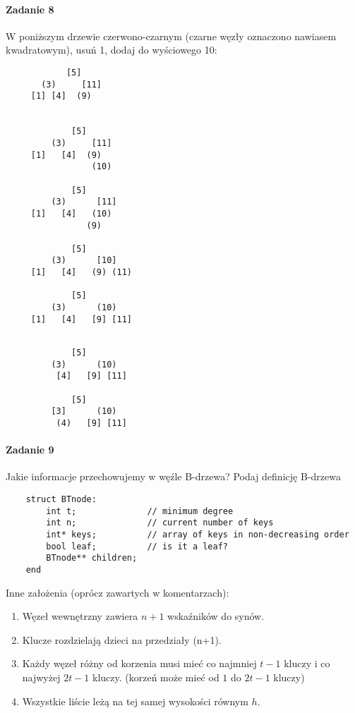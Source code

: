 \documentclass[18pt]{extarticle}
\begin{document}
\paragraph{Zadanie 8} W poniższym drzewie czerwono-czarnym (czarne węzły oznaczono nawiasem kwadratowym), usuń 1, dodaj do wyściowego 10:

\begin{multicols}{2}
    \begin{lstlisting}
            [5] 
       (3)     [11] 
     [1] [4]  (9) 
    
    
             [5] 
         (3)     [11] 
     [1]   [4]  (9) 
                 (10) 
     
             [5] 
         (3)      [11] 
     [1]   [4]   (10) 
                (9) 
     
             [5] 
         (3)      [10] 
     [1]   [4]   (9) (11)
     
             [5] 
         (3)      (10) 
     [1]   [4]   [9] [11]
                 
    \end{lstlisting}
    
    \columnbreak
    \begin{lstlisting}
             [5] 
         (3)      (10) 
          [4]   [9] [11]
    
             [5] 
         [3]      (10) 
          (4)   [9] [11]
    \end{lstlisting}
    \end{multicols}

\paragraph{Zadanie 9} Jakie informacje przechowujemy w węźle B-drzewa? Podaj definicję B-drzewa

\begin{lstlisting}
    struct BTnode:
        int t;              // minimum degree
        int n;              // current number of keys
        int* keys;          // array of keys in non-decreasing order
        bool leaf;          // is it a leaf?
        BTnode** children;
    end
\end{lstlisting}
Inne założenia (oprócz zawartych w komentarzach):
\begin{enumerate}
    \item Węzeł wewnętrzny zawiera $n+1$ wskaźników do synów.
    \item Klucze rozdzielają dzieci na przedziały (n+1).
    \item Każdy węzeł różny od korzenia musi mieć co najmniej $t-1$ kluczy i co najwyżej $2t-1$ kluczy. (korzeń może mieć od $1$ do $2t-1$ kluczy)
    \item Wszystkie liście leżą na tej samej wysokości równym $h$.
\end{enumerate}
\end{document}

